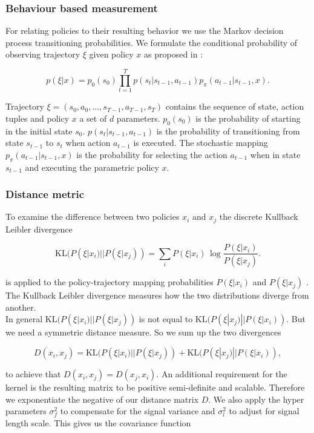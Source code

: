 \subsubsection{Behaviour based measurement}

For relating policies to their resulting behavior we use the Markov decision process transitioning probabilities. We formulate the conditional probability of observing trajectory $\xi$ given policy $x$ as proposed in \cite{wilson2014using}:

$$p(\xi|x) = p_{0}(s_{0}) \prod_{t=1}^{T} p(s_{t}|s_{t-1}, a_{t-1}) p_{\pi}(a_{t-1}|s_{t-1}, x).$$

Trajectory $\xi=(s_{0},a_{0}, ..., s_{T-1}, a_{T-1}, s_{T})$ contains the sequence of state, action tuples and policy $x$ a set of $d$ parameters. $p_{0}(s_{0})$ is the probability of starting in the initial state $s_{0}$. $p(s_{t}|s_{t-1}, a_{t-1})$ is the probability of transitioning from state $s_{t-1}$ to $s_{t}$ when action $a_{t-1}$ is executed. The stochastic mapping $p_{\pi}(a_{t-1}|s_{t-1},x)$ is the probability for selecting the action $a_{t-1}$ when in state $s_{t-1}$ and executing the parametric policy $x$.

\subsubsection{Distance metric}
To examine the difference between two policies $x_{ i }$ and $x_{ j }$ the discrete Kullback Leibler divergence

$$\mathrm {KL}(P(\xi|x_{ i })||P(\xi|x_{ j })) = \sum _{i}P(\xi|x_{ i })\,\log {\frac {P(\xi|x_{ i })}{P(\xi|x_{ j })}}.$$

is applied to the policy-trajectory mapping probabilities $P(\xi|x_{ i })$ and $P(\xi|x_{ j })$ \cite{wilson2014using}. The Kullback Leibler divergence measures how the two distributions diverge from another.\\

In general $\mathrm {KL}(P(\xi|x_{ i })||P(\xi|x_{ j }))$ is not equal to $\mathrm {KL}(P(\xi|x_{ j })||P(\xi|x_{ i }))$. But we need a symmetric distance measure. So we sum up the two divergences

$$D(x_{ i }, x_{ j }) = \mathrm {KL}(P(\xi|x_{ i })||P(\xi|x_{ j })) + \mathrm {KL}(P(\xi|x_{ j })||P(\xi|x_{ i })),$$

to achieve that $D(x_{ i }, x_{ j }) = D(x_{ j }, x_{ i })$. An additional requirement for the kernel is the resulting matrix to be positive semi-definite and scalable\cite{wilson2014using}. Therefore we exponentiate the negative of our distance matrix $D$. We also apply the hyper parameters $\sigma_f^2$ to compensate for the signal variance and $\sigma_l^2$ to adjust for signal length scale. This gives us the covariance function


